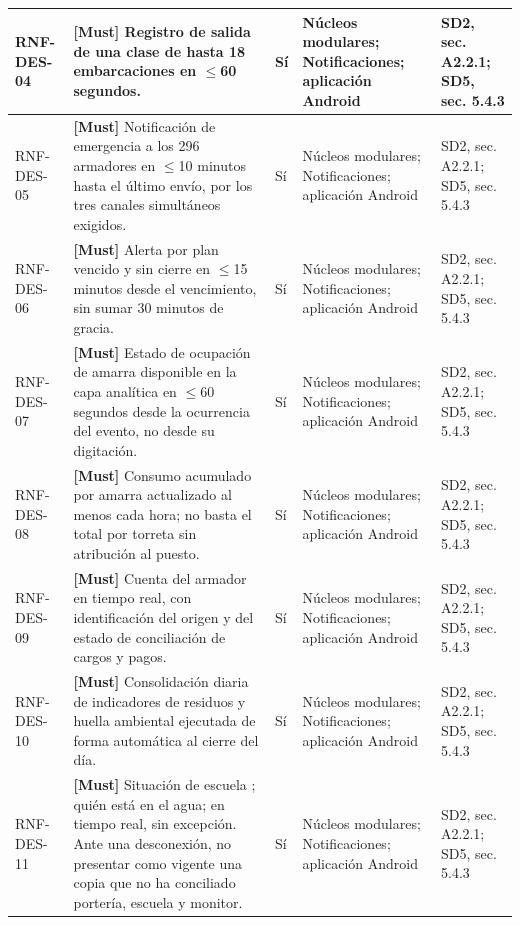 \begin{paginaHorizontalSynaptix}
\begin{longtable}{|L{0.09\AnchoMatrizTDoce}|L{0.385\AnchoMatrizTDoce}|L{0.065\AnchoMatrizTDoce}|L{0.18\AnchoMatrizTDoce}|L{0.28\AnchoMatrizTDoce}|}
RNF-\allowbreak{}DES-\allowbreak{}04 &
\textbf{[Must]} Registro de salida de una clase de hasta 18 embarcaciones en \(\leq\)60 segundos. &
Sí &
Núcleos modulares; Notificaciones; aplicación Android &
SD2, sec. A2.2.1; SD5, sec. 5.4.3 \\ \hline

RNF-\allowbreak{}DES-\allowbreak{}05 &
\textbf{[Must]} Notificación de emergencia a los 296 armadores en \(\leq\)10 minutos hasta el último envío, por los tres canales simultáneos exigidos. &
Sí &
Núcleos modulares; Notificaciones; aplicación Android &
SD2, sec. A2.2.1; SD5, sec. 5.4.3 \\ \hline

RNF-\allowbreak{}DES-\allowbreak{}06 &
\textbf{[Must]} Alerta por plan vencido y sin cierre en \(\leq\)15 minutos desde el vencimiento, sin sumar 30 minutos de gracia. &
Sí &
Núcleos modulares; Notificaciones; aplicación Android &
SD2, sec. A2.2.1; SD5, sec. 5.4.3 \\ \hline

RNF-\allowbreak{}DES-\allowbreak{}07 &
\textbf{[Must]} Estado de ocupación de amarra disponible en la capa analítica en \(\leq\)60 segundos desde la ocurrencia del evento, no desde su digitación. &
Sí &
Núcleos modulares; Notificaciones; aplicación Android &
SD2, sec. A2.2.1; SD5, sec. 5.4.3 \\ \hline

RNF-\allowbreak{}DES-\allowbreak{}08 &
\textbf{[Must]} Consumo acumulado por amarra actualizado al menos cada hora; no basta el total por torreta sin atribución al puesto. &
Sí &
Núcleos modulares; Notificaciones; aplicación Android &
SD2, sec. A2.2.1; SD5, sec. 5.4.3 \\ \hline

RNF-\allowbreak{}DES-\allowbreak{}09 &
\textbf{[Must]} Cuenta del armador en tiempo real, con identificación del origen y del estado de conciliación de cargos y pagos. &
Sí &
Núcleos modulares; Notificaciones; aplicación Android &
SD2, sec. A2.2.1; SD5, sec. 5.4.3 \\ \hline

RNF-\allowbreak{}DES-\allowbreak{}10 &
\textbf{[Must]} Consolidación diaria de indicadores de residuos y huella ambiental ejecutada de forma automática al cierre del día. &
Sí &
Núcleos modulares; Notificaciones; aplicación Android &
SD2, sec. A2.2.1; SD5, sec. 5.4.3 \\ \hline

RNF-\allowbreak{}DES-\allowbreak{}11 &
\textbf{[Must]} Situación de escuela ; quién está en el agua;  en tiempo real, sin excepción. Ante una desconexión, no presentar como vigente una copia que no ha conciliado portería, escuela y monitor. &
Sí &
Núcleos modulares; Notificaciones; aplicación Android &
SD2, sec. A2.2.1; SD5, sec. 5.4.3 \\ \hline


\end{longtable}
\end{paginaHorizontalSynaptix}
